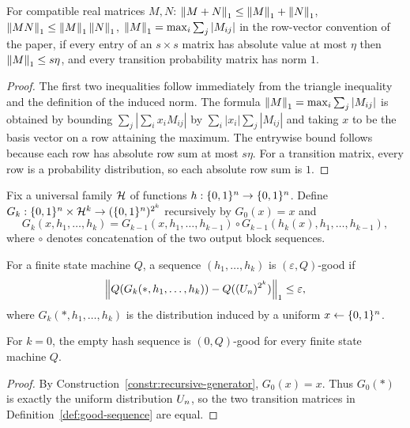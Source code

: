 \begin{lemma}
  \label{lem:matrix-norm-facts}
  For compatible real matrices $M,N$:
  $\left\|M+N\right\|_1\le \left\|M\right\|_1+\left\|N\right\|_1$,
  $\left\|MN\right\|_1\le \left\|M\right\|_1\left\|N\right\|_1$,
  $\left\|M\right\|_1=\max_i\sum_j |M_{ij}|$ in the row-vector convention of the paper,
  if every entry of an $s \times s$ matrix has absolute value at most $\eta$
  then $\left\|M\right\|_1\le s\eta$, and every transition probability matrix has norm
  $1$.
\end{lemma}
\begin{proof}
  The first two inequalities follow immediately from the triangle inequality
  and the definition of the induced norm. The formula
  $\left\|M\right\|_1=\max_i\sum_j |M_{ij}|$ is obtained by bounding
  $\sum_j|\sum_i x_iM_{ij}|$ by
  $\sum_i |x_i|\sum_j|M_{ij}|$ and taking $x$ to be the basis vector on a row
  attaining the maximum. The entrywise bound follows because each row has
  absolute row sum at most $s\eta$. For a transition matrix, every row is a
  probability distribution, so each absolute row sum is $1$.
\end{proof}

\begin{construction}
  \label{constr:recursive-generator}
  Fix a universal family $\mathcal{H}$ of functions $h:\{0,1\}^n \to \{0,1\}^n$. Define
  $G_k:\{0,1\}^n \times \mathcal{H}^k \to (\{0,1\}^n)^{2^k}$ recursively by
  $G_0(x)=x$ and
  \[
    G_k(x,h_1,\ldots,h_k)
    =
    G_{k-1}(x,h_1,\ldots,h_{k-1})
    \circ
    G_{k-1}(h_k(x),h_1,\ldots,h_{k-1}),
  \]
  where $\circ$ denotes concatenation of the two output block sequences.
\end{construction}

\begin{definition}
  \label{def:good-sequence}
  For a finite state machine $Q$, a sequence $(h_1,\ldots,h_k)$ is
  $(\varepsilon,Q)$-good if
  \[
    \left\|Q(G_k(*,h_1,\ldots,h_k))-Q((U_n)^{2^k})\right\|_1\le \varepsilon,
  \]
  where $G_k(*,h_1,\ldots,h_k)$ is the distribution induced by a uniform
  $x \leftarrow \{0,1\}^n$.
\end{definition}

\begin{lemma}
  \label{lem:good-induction-base}
  For $k=0$, the empty hash sequence is $(0,Q)$-good for every finite state
  machine $Q$.
\end{lemma}
\begin{proof}
  By Construction~\ref{constr:recursive-generator}, $G_0(x)=x$. Thus
  $G_0(*)$ is exactly the uniform distribution $U_n$, so the two transition
  matrices in Definition~\ref{def:good-sequence} are equal.
\end{proof}

